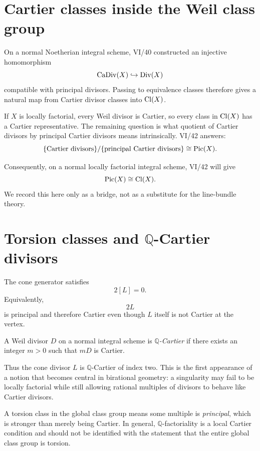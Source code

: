 \section{Cartier classes inside the Weil class group}

On a normal Noetherian integral scheme, VI/40 constructed an injective homomorphism
\[
  \operatorname{CaDiv}(X)\hookrightarrow\operatorname{Div}(X)
\]
compatible with principal divisors. Passing to equivalence classes therefore gives a natural map from Cartier divisor classes into \(\operatorname{Cl}(X)\).

If \(X\) is locally factorial, every Weil divisor is Cartier, so every class in \(\operatorname{Cl}(X)\) has a Cartier representative. The remaining question is what quotient of Cartier divisors by principal Cartier divisors means intrinsically. VI/42 answers:
\[
  \{\text{Cartier divisors}\}/\{\text{principal Cartier divisors}\}
  \cong
  \operatorname{Pic}(X).
\]

Consequently, on a normal locally factorial integral scheme, VI/42 will give
\[
  \operatorname{Pic}(X)\cong\operatorname{Cl}(X).
\]
We record this here only as a bridge, not as a substitute for the line-bundle theory.

\section{Torsion classes and \(\mathbb Q\)-Cartier divisors}

The cone generator satisfies
\[
  2[L]=0.
\]
Equivalently,
\[
  2L
\]
is principal and therefore Cartier even though \(L\) itself is not Cartier at the vertex.

\begin{definition}\label{def:vi41-q-cartier}
A Weil divisor \(D\) on a normal integral scheme is \emph{\(\mathbb Q\)-Cartier} if there exists an integer \(m>0\) such that \(mD\) is Cartier.
\end{definition}

Thus the cone divisor \(L\) is \(\mathbb Q\)-Cartier of index two. This is the first appearance of a notion that becomes central in birational geometry: a singularity may fail to be locally factorial while still allowing rational multiples of divisors to behave like Cartier divisors.

\begin{warning}
A torsion class in the global class group means some multiple is \emph{principal}, which is stronger than merely being Cartier. In general, \(\mathbb Q\)-factoriality is a local Cartier condition and should not be identified with the statement that the entire global class group is torsion.
\end{warning}

